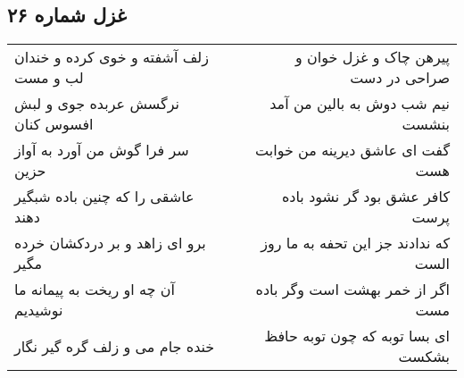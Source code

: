 \begin{center}
\section*{غزل شماره ۲۶}
\label{sec:sh026}
\begin{longtable}{l p{0.5cm} r}
زلف آشفته و خوی کرده و خندان لب و مست
&&
پیرهن چاک و غزل خوان و صراحی در دست
\\
نرگسش عربده جوی و لبش افسوس کنان
&&
نیم شب دوش به بالین من آمد بنشست
\\
سر فرا گوش من آورد به آواز حزین
&&
گفت ای عاشق دیرینه من خوابت هست
\\
عاشقی را که چنین باده شبگیر دهند
&&
کافر عشق بود گر نشود باده پرست
\\
برو ای زاهد و بر دردکشان خرده مگیر
&&
که ندادند جز این تحفه به ما روز الست
\\
آن چه او ریخت به پیمانه ما نوشیدیم
&&
اگر از خمر بهشت است وگر باده مست
\\
خنده جام می و زلف گره گیر نگار
&&
ای بسا توبه که چون توبه حافظ بشکست
\\
\end{longtable}
\end{center}
